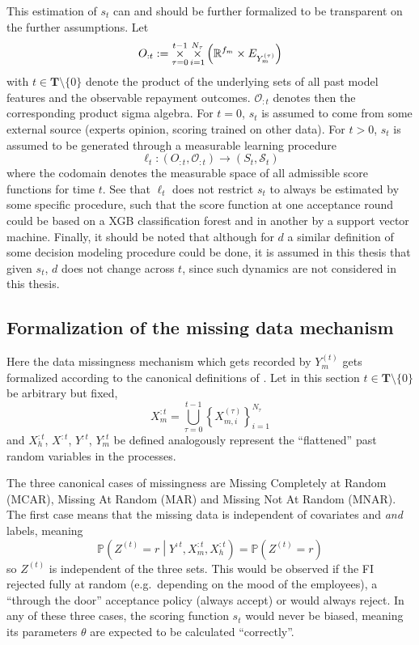 \documentclass[
  12pt,
]{article}
\begin{document}
This estimation of \(s_t\) can and should be further formalized to be
transparent on the further assumptions. Let \[
O_{:t} := \mathop{\Large\times}\limits_{\tau = 0}^{t-1} \mathop{\Large\times}\limits_{i=1}^{N_\tau}
        \left(\mathbb{R}^{f_m} \times E_{Y_m^{(\tau)}} \right)
\] with \(t \in \mathbf{T} \setminus \{0\}\) denote the product of the
underlying sets of all past model features and the observable repayment
outcomes. \(\mathcal{O}_{:t}\) denotes then the corresponding product
sigma algebra. For \(t=0\), \(s_t\) is assumed to come from some
external source (experts opinion, scoring trained on other data). For
\(t>0\), \(s_t\) is assumed to be generated through a measurable
learning procedure \[
\ell_t : \left(O_{:t}, \mathcal{O}_{:t}\right) \to \left(S_t, \mathcal{S}_t \right)
\] where the codomain denotes the measurable space of all admissible
score functions for time \(t\). See that \(\ell_t\) does not restrict
\(s_t\) to always be estimated by some specific procedure, such that the
score function at one acceptance round could be based on a XGB
classification forest and in another by a support vector machine.
Finally, it should be noted that although for \(d\) a similar definition
of some decision modeling procedure could be done, it is assumed in this
thesis that given \(s_t\), \(d\) does not change across \(t\), since
such dynamics are not considered in this thesis.

\subsection{Formalization of the missing data
mechanism}\label{sec-formalization-missing-data-mechanism}

Here the data missingness mechanism which gets recorded by \(Y^{(t)}_m\)
gets formalized according to the canonical definitions of
\textcite{littleAndRubingAnalysisWithMissingData}. Let in this section
\(t \in \mathbf{T} \setminus \{0\}\) be arbitrary but fixed, \[
X_m^{:t} = \bigcup_{\tau = 0}^{t-1}
 \left\{X^{(\tau)}_{m,i}\right\}_{i=1}^{N_\tau}
\] and \(X_h^{:t}\), \(X^{:t}\), \(Y^{:t}\), \(Y_m^{:t}\) be defined
analogously represent the ``flattened'' past random variables in the
processes.

The three canonical cases of missingness are Missing Completely at
Random (MCAR), Missing At Random (MAR) and Missing Not At Random (MNAR).
The first case means that the missing data is independent of covariates
and \emph{and} labels, meaning \[
\mathbb{P}\left(Z^{(t)} = r \middle | Y^{:t}, X_m^{:t}, X_h^{:t} \right) =
\mathbb{P}\left(Z^{(t)} = r \right)
\] so \(Z^{(t)}\) is independent of the three sets. This would be
observed if the FI rejected fully at random (e.g.~depending on the mood
of the employees), a ``through the door'' acceptance policy (always
accept) or would always reject. In any of these three cases, the scoring
function \(s_t\) would never be biased, meaning its parameters
\(\theta\) are expected to be calculated ``correctly''.
\end{document}
